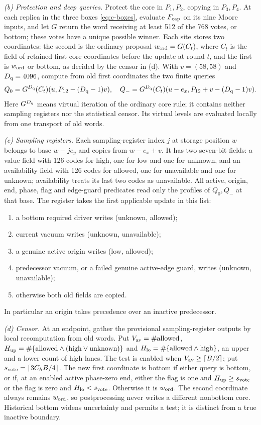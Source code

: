 \emph{(b) Protection and deep queries.} Protect the core in \(P_1,P_2\), copying in \(P_3,P_4\). At each replica in the three boxes \eqref{eq:c-boxes}, evaluate \(F_{\rm cap}\) on its nine Moore inputs, and let \(G\) return the word receiving at least 512 of the 768 votes, or bottom; these votes have a unique possible winner. Each site stores two coordinates: the second is the ordinary proposal \(w_{\rm ord}=G(C_t)\), where \(C_t\) is the field of retained first core coordinates before the update at round \(t\), and the first is \(w_{\rm ord}\) or bottom, as decided by the censor in (d). With \(v=(58,58)\) and \(D_{\rm q}=4096\), compute from old first coordinates the two finite queries
\[
 Q_0=G^{D_{\rm q}}(C_t)(u,P_{12}-(D_{\rm q}-1)v),\quad
 Q_-=G^{D_{\rm q}}(C_t)(u-e_x,P_{12}+v-(D_{\rm q}-1)v).
\]
Here \(G^{D_{\rm q}}\) means virtual iteration of the ordinary core rule; it contains neither sampling registers nor the statistical censor. Its virtual levels are evaluated locally from one transport of old words.

\emph{(c) Sampling registers.} Each sampling-register index \(j\) at storage position \(w\) belongs to base \(w-je_y\) and copies from \(w-e_x+v\). It has two seven-bit fields: a value field with 126 codes for high, one for low and one for unknown, and an availability field with 126 codes for allowed, one for unavailable and one for unknown; availability treats its last two codes as unavailable. All active, origin, end, phase, flag and edge-guard predicates read only the profiles of \(Q_0,Q_-\) at that base. The register takes the first applicable update in this list:
\begin{enumerate}[label=\arabic*.]
\item a bottom required driver writes (unknown, allowed);
\item current vacuum writes (unknown, unavailable);
\item a genuine active origin writes (low, allowed);
\item predecessor vacuum, or a failed genuine active-edge guard, writes (unknown, unavailable);
\item otherwise both old fields are copied.
\end{enumerate}
In particular an origin takes precedence over an inactive predecessor.

\emph{(d) Censor.} At an endpoint, gather the provisional sampling-register outputs by local recomputation from old words. Put \(V_{\rm av}=\#\text{allowed}\), \(H_{\rm up}=\#\{\text{allowed}\land(\text{high}\lor\text{unknown})\}\) and \(H_{\rm lo}=\#\{\text{allowed}\land\text{high}\}\), an upper and a lower count of high lanes. The test is enabled when \(V_{\rm av}\ge\lceil B/2\rceil\); put \(s_{\rm vote}=\lceil3C_hB/4\rceil\). The new first coordinate is bottom if either query is bottom, or if, at an enabled active phase-zero end, either the flag is one and \(H_{\rm up}\ge s_{\rm vote}\) or the flag is zero and \(H_{\rm lo}<s_{\rm vote}\). Otherwise it is \(w_{\rm ord}\). The second coordinate always remains \(w_{\rm ord}\), so postprocessing never writes a different nonbottom core. Historical bottom widens uncertainty and permits a test; it is distinct from a true inactive boundary.

